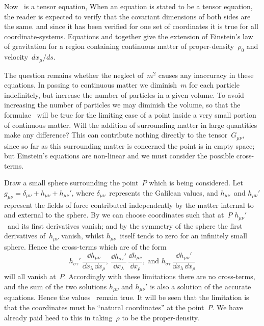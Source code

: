 \documentclass[12pt]{book}
\begin{document}
Now ~is a tensor equation\footnotemark,\footnotetext
  {When an equation is stated to be a tensor equation, the reader is expected to verify that the
  covariant dimensions of both sides are the same.}
and since it has been verified for one set
of coordinates it is true for all coordinate-systems. Equations  and 
together give the extension of Einstein's law of gravitation for a region containing
continuous matter of proper-density~$\rho_{0}$ and velocity~$dx_{\mu}/ds$.

The question remains whether the neglect of~$m^{2}$ causes any inaccuracy in
these equations. In passing to continuous matter we diminish~$m$ for each
particle indefinitely, but increase the number of particles in a given volume.
To avoid increasing the number of particles we may diminish the volume, so
that the formulae~ will be true for the limiting case of a point inside a
very small portion of continuous matter. Will the addition of surrounding
matter in large quantities make any difference? This can contribute nothing
directly to the tensor~$G_{\mu\nu}$, since so far as this surrounding matter is concerned
the point is in empty space; but Einstein's equations are non-linear and we
must consider the possible cross-terms.

Draw a small sphere surrounding the point~$P$ which is being considered.
Let $g_{\mu\nu} = \delta_{\mu\nu} + h_{\mu\nu} + h_{\mu\nu}'$, where $\delta_{\mu\nu}$~represents the Galilean values, and $h_{\mu\nu}$~and
$h_{\mu\nu}'$ represent the fields of force contributed independently by the matter internal
to and external to the sphere. By  we can choose coordinates such
that at~$P$ $h_{\mu\nu}'$~and its first derivatives vanish; and by the symmetry of the
sphere the first derivatives of~$h_{\mu\nu}$ vanish, whilst $h_{\mu\nu}$~itself tends to zero for an
infinitely small sphere. Hence the cross-terms which are of the form
\[
h_{\sigma\tau}'\, \frac{\dd h_{\mu\nu}}{\dd x_{\lambda}\, \dd x_{\rho}},\
\frac{\dd h_{\sigma\tau}'}{\dd x_{\lambda}}\, \frac{\dd h_{\mu\nu}}{\dd x_{\rho}},\
\text{and }
h_{\sigma\tau}\, \frac{\dd h_{\mu\nu}'}{\dd x_{\lambda}\, \dd x_{\rho}}
\]
will all vanish at~$P$. Accordingly with these limitations there are no cross-terms,
and the sum of the two solutions $h_{\mu\nu}$ and $h_{\mu\nu}'$ is also a solution of the
accurate equations. Hence the values~\Eq{(46.5)} remain true. It will be seen that
the limitation is that the coordinates must be ``natural coordinates'' at the
point~$P$. We have already paid heed to this in taking~$\rho$ to be the proper-density.
\end{document}
